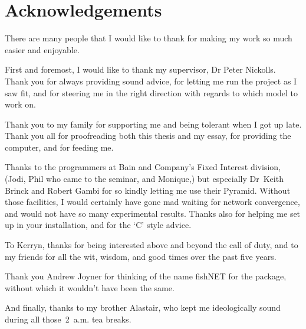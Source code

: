 \documentclass[12pt]{report}
\begin{document}
\chapter*{Acknowledgements}

There are many people that I would like to thank for making my work so
much easier and enjoyable.

First and foremost, I would like to thank my supervisor, Dr Peter Nickolls.
Thank you for always
providing sound advice, for letting me run the project
as I saw fit, and for steering me in the right direction with regards
to which model to work on.

Thank you to my family for supporting me and being tolerant when
I got up late.
Thank you all for proofreading both this thesis and my essay, 
for providing the computer, and for feeding me.

Thanks to the programmers at Bain and Company's Fixed Interest
division, (Jodi, Phil who came
to the seminar, and Monique,) but especially 
Dr~Keith Brinck and Robert Gambi for so kindly letting me use their
Pyramid.
Without those facilities, I would certainly have gone mad
waiting for network convergence, and would not have so many
experimental results.
Thanks also for helping me set up in your installation, and for the `C'
style advice.

To Kerryn, thanks for being interested above and beyond the call of
duty, and to my friends for all the wit, wisdom, and good times
over the past five years.

Thank you Andrew Joyner for thinking of the name fishNET for the package,
without which it wouldn't have been the same.

And finally, thanks to my brother Alastair, who kept me ideologically sound
during all those~2~a.m. tea breaks.
\end{document}

